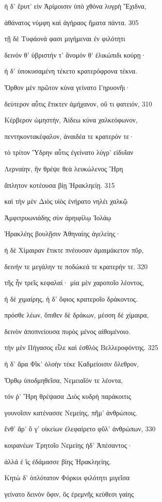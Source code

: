 ἡ δ' ἔρυτ' εἰν Ἀρίμοισιν ὑπὸ χθόνα λυγρὴ Ἔχιδνα, 

ἀθάνατος νύμφη καὶ ἀγήραος ἤματα πάντα. \num{305}

τῇ δὲ Τυφάονά φασι μιγήμεναι ἐν φιλότητι

δεινόν θ' ὑβριστήν τ' ἄνομόν θ' ἑλικώπιδι κούρῃ· 

ἡ δ' ὑποκυσαμένη τέκετο κρατερόφρονα τέκνα.

Ὄρθον μὲν πρῶτον κύνα γείνατο Γηρυονῆι· 

δεύτερον αὖτις ἔτικτεν ἀμήχανον, οὔ τι φατειόν, \num{310} 

Κέρβερον ὠμηστήν, Ἀίδεω κύνα χαλκεόφωνον,

πεντηκοντακέφαλον, ἀναιδέα τε κρατερόν τε· 

τὸ τρίτον Ὕδρην αὖτις ἐγείνατο λύγρ' εἰδυῖαν 

Λερναίην, ἣν θρέψε θεὰ λευκώλενος Ἥρη

ἄπλητον κοτέουσα βίῃ Ἡρακληείῃ. \num{315}

καὶ τὴν μὲν Διὸς υἱὸς ἐνήρατο νηλέι χαλκῷ

Ἀμφιτρυωνιάδης σὺν ἀρηιφίλῳ Ἰολάῳ

Ἡρακλέης βουλῇσιν Ἀθηναίης ἀγελείης·

ἡ δὲ Χίμαιραν ἔτικτε πνέουσαν ἀμαιμάκετον πῦρ,

δεινήν τε μεγάλην τε ποδώκεά τε κρατερήν τε. \num{320} 

τῆς ἦν τρεῖς κεφαλαί· μία μὲν χαροποῖο λέοντος,

ἡ δὲ χιμαίρης, ἡ δ' ὄφιος κρατεροῖο δράκοντος.

πρόσθε λέων, ὄπιθεν δὲ δράκων, μέσση δὲ χίμαιρα,

δεινὸν ἀποπνείουσα πυρὸς μένος αἰθομένοιο.

τὴν μὲν Πήγασος εἷλε καὶ ἐσθλὸς Βελλεροφόντης. \num{325}

ἡ δ' ἄρα Φῖκ' ὀλοὴν τέκε Καδμείοισιν ὄλεθρον,

Ὄρθῳ ὑποδμηθεῖσα, Νεμειαῖόν τε λέοντα, 

τόν ῥ' Ἥρη θρέψασα Διὸς κυδρὴ παράκοιτις

γουνοῖσιν κατένασσε Νεμείης, πῆμ' ἀνθρώποις.

ἔνθ' ἄρ' ὅ γ' οἰκείων ἐλεφαίρετο φῦλ' ἀνθρώπων, \num{330}

κοιρανέων Τρητοῖο Νεμείης ἠδ' Ἀπέσαντος· 

ἀλλά ἑ ἲς ἐδάμασσε βίης Ἡρακληείης.

Κητὼ δ' ὁπλότατον Φόρκυι φιλότητι μιγεῖσα

γείνατο δεινὸν ὄφιν, ὃς ἐρεμνῆς κεύθεσι γαίης

